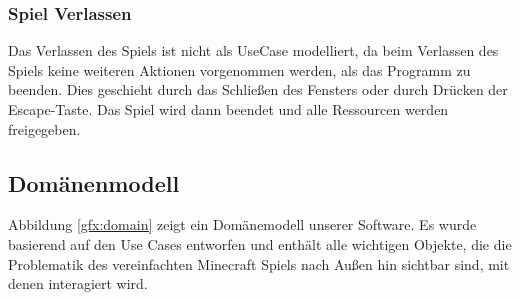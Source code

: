 \documentclass{article}
\begin{document}
\subsubsection*{Spiel Verlassen}

Das Verlassen des Spiels ist nicht als UseCase modelliert, da beim Verlassen des Spiels keine weiteren Aktionen vorgenommen werden, als das Programm zu beenden. Dies geschieht durch das Schließen des Fensters oder durch Drücken der Escape-Taste. Das Spiel wird dann beendet und alle Ressourcen werden freigegeben.

\subsection{Domänenmodell} \label{subsec:domain}

Abbildung \ref{gfx:domain} zeigt ein Domänemodell unserer Software. Es wurde basierend auf den Use Cases entworfen und enthält alle wichtigen Objekte, die die Problematik des vereinfachten Minecraft Spiels nach Außen hin sichtbar sind, mit denen interagiert wird. 
\end{document}
